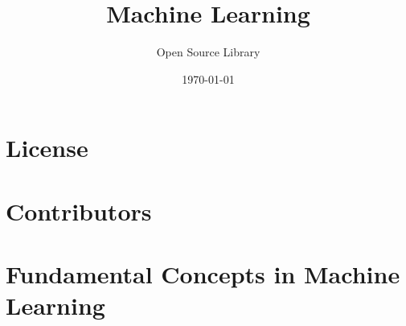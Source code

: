 \documentclass[11pt,a4paper]{book}
\begin{document}
\frontmatter
\title{Machine Learning}
\author{Open Source Library}
\date{\today}
\maketitle

\tableofcontents

\mainmatter{}

\chapter*{License}


\chapter*{Contributors}


\chapter{Fundamental Concepts in Machine Learning}

\end{document}
